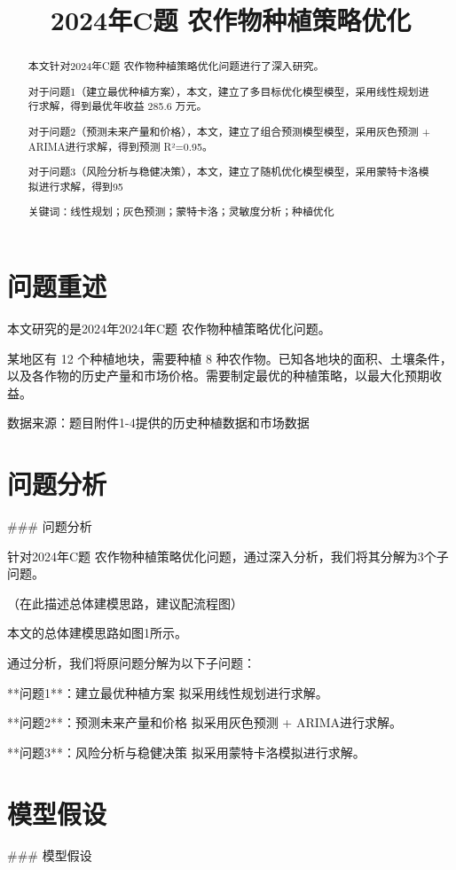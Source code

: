 \documentclass[12pt,a4paper]{article}
\title{\textbf{2024年C题 农作物种植策略优化}}
\date{}
\begin{document}
\maketitle

\begin{abstract}
本文针对2024年C题 农作物种植策略优化问题进行了深入研究。

对于问题1（建立最优种植方案），本文，建立了多目标优化模型模型，采用线性规划进行求解，得到最优年收益 285.6 万元。

对于问题2（预测未来产量和价格），本文，建立了组合预测模型模型，采用灰色预测 + ARIMA进行求解，得到预测 R²=0.95。

对于问题3（风险分析与稳健决策），本文，建立了随机优化模型模型，采用蒙特卡洛模拟进行求解，得到95%

关键词：线性规划；灰色预测；蒙特卡洛；灵敏度分析；种植优化

\end{abstract}

\section{问题重述}
本文研究的是2024年2024年C题 农作物种植策略优化问题。

某地区有 12 个种植地块，需要种植 8 种农作物。已知各地块的面积、土壤条件，以及各作物的历史产量和市场价格。需要制定最优的种植策略，以最大化预期收益。

数据来源：题目附件1-4提供的历史种植数据和市场数据

\section{问题分析}
### 问题分析

针对2024年C题 农作物种植策略优化问题，通过深入分析，我们将其分解为3个子问题。

（在此描述总体建模思路，建议配流程图）

本文的总体建模思路如图1所示。

通过分析，我们将原问题分解为以下子问题：

**问题1**：建立最优种植方案
拟采用线性规划进行求解。

**问题2**：预测未来产量和价格
拟采用灰色预测 + ARIMA进行求解。

**问题3**：风险分析与稳健决策
拟采用蒙特卡洛模拟进行求解。


\section{模型假设}
### 模型假设
\end{document}
